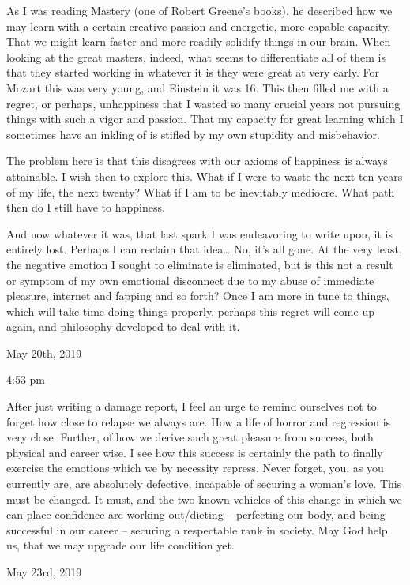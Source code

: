 As I was reading Mastery (one of Robert Greene's books), he described
how we may learn with a certain creative passion and energetic, more
capable capacity. That we might learn faster and more readily solidify
things in our brain. When looking at the great masters, indeed, what
seems to differentiate all of them is that they started working in
whatever it is they were great at very early. For Mozart this was very
young, and Einstein it was 16. This then filled me with a regret, or
perhaps, unhappiness that I wasted so many crucial years not pursuing
things with such a vigor and passion. That my capacity for great
learning which I sometimes have an inkling of is stifled by my own
stupidity and misbehavior.

The problem here is that this disagrees with our axioms of happiness is
always attainable. I wish then to explore this. What if I were to waste
the next ten years of my life, the next twenty? What if I am to be
inevitably mediocre. What path then do I still have to happiness.

And now whatever it was, that last spark I was endeavoring to write
upon, it is entirely lost. Perhaps I can reclaim that idea\ldots{} No,
it's all gone. At the very least, the negative emotion I sought to
eliminate is eliminated, but is this not a result or symptom of my own
emotional disconnect due to my abuse of immediate pleasure, internet and
fapping and so forth? Once I am more in tune to things, which will take
time doing things properly, perhaps this regret will come up again, and
philosophy developed to deal with it.

\bigskip
\bigskip
May 20th, 2019

4:53 pm

After just writing a damage report, I feel an urge to remind ourselves
not to forget how close to relapse we always are. How a life of horror
and regression is very close. Further, of how we derive such great
pleasure from success, both physical and career wise. I see how this
success is certainly the path to finally exercise the emotions which we
by necessity repress. Never forget, you, as you currently are, are
absolutely defective, incapable of securing a woman's love. This must be
changed. It must, and the two known vehicles of this change in which we
can place confidence are working out/dieting -- perfecting our body, and
being successful in our career -- securing a respectable rank in
society. May God help us, that we may upgrade our life condition yet.

\bigskip
\bigskip
May 23rd, 2019

